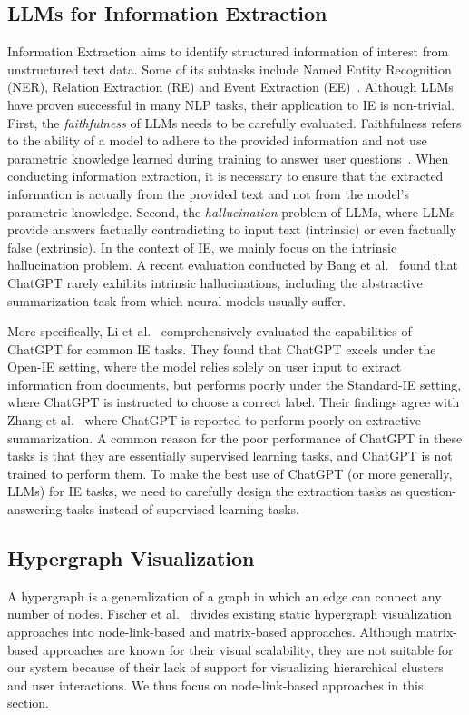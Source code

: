 \subsection{LLMs for Information Extraction}
Information Extraction aims to identify structured information of interest from unstructured text data.
Some of its subtasks include Named Entity Recognition (NER), Relation Extraction (RE) and Event Extraction (EE)~\cite{nasar2021named, xiang2019surveyee}.
Although LLMs have proven successful in many NLP tasks, their application to IE is non-trivial.
First, the \textit{faithfulness} of LLMs needs to be carefully evaluated.
Faithfulness refers to the ability of a model to adhere to the provided information and not use parametric knowledge learned during training to answer user questions~\cite{zhou2023contextfaithful}.
When conducting information extraction, it is necessary to ensure that the extracted information is actually from the provided text and not from the model's parametric knowledge.
Second, the \textit{hallucination} problem of LLMs, where LLMs provide answers factually contradicting to input text (intrinsic) or even factually false (extrinsic). 
In the context of IE, we mainly focus on the intrinsic hallucination problem.
A recent evaluation conducted by Bang et al.~\cite{bang2023multitask} found that ChatGPT rarely exhibits intrinsic hallucinations, including the abstractive summarization task from which neural models usually suffer.

More specifically, Li et al.~\cite{li2023evaluateChatgpt} comprehensively evaluated the capabilities of ChatGPT for common IE tasks.
They found that ChatGPT excels under the Open-IE setting, where the model relies solely on user input to extract information from documents, but performs poorly under the Standard-IE setting, where ChatGPT is instructed to choose a correct label.
Their findings agree with Zhang et al.~\cite{zhang2023extractive} where ChatGPT is reported to perform poorly on extractive summarization.
A common reason for the poor performance of ChatGPT in these tasks is that they are essentially supervised learning tasks, and ChatGPT is not trained to perform them.
To make the best use of ChatGPT (or more generally, LLMs) for IE tasks, we need to carefully design the extraction tasks as question-answering tasks instead of supervised learning tasks.

\subsection{Hypergraph Visualization}
A hypergraph is a generalization of a graph in which an edge can connect any number of nodes.
Fischer et al.~\cite{fischer2021hypergraphsurvey} divides existing static hypergraph visualization approaches into node-link-based and matrix-based approaches.
Although matrix-based approaches are known for their visual scalability, they are not suitable for our system because of their lack of support for visualizing hierarchical clusters and user interactions.
We thus focus on node-link-based approaches in this section.

